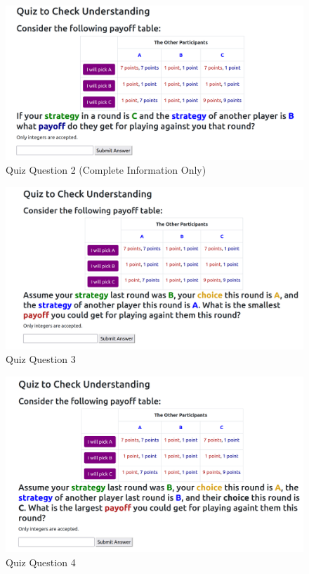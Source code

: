 \begin{figure}[h]
\captionsetup{justification=centering}
  \caption[caption]{Quiz Question 2 (Complete Information Only)}
   \label{fig:QuizQ2}
    \includegraphics[width = \textwidth]{Images/Q2.png}  
\end{figure}

\begin{figure}[h]
\captionsetup{justification=centering}
  \caption[caption]{Quiz Question 3}
   \label{fig:QuizQ3}
    \includegraphics[width = \textwidth]{Images/Q3.png}
\end{figure}

\begin{figure}[h]
\captionsetup{justification=centering}
  \caption[caption]{Quiz Question 4}
   \label{fig:QuizQ4}
    \includegraphics[width = \textwidth]{Images/Q4.png}
\end{figure}

